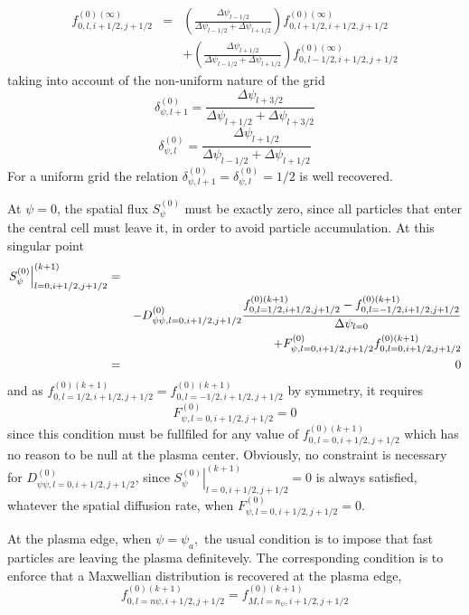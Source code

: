 \begin{eqnarray}
f_{0,l,i+1/2,j+1/2}^{\left( 0\right) (\infty )} &=&\left( \frac{\Delta \psi
_{l-1/2}}{\Delta \psi _{l-1/2}+\Delta \psi _{l+1/2}}\right)
f_{0,l+1/2,i+1/2,j+1/2}^{\left( 0\right) (\infty )}  \nonumber \\
&&+\left( \frac{\Delta \psi _{l+1/2}}{\Delta \psi _{l-1/2}+\Delta \psi
_{l+1/2}}\right) f_{0,l-1/2,i+1/2,j+1/2}^{\left( 0\right) (\infty )}
\end{eqnarray}
taking into account of the non-uniform nature of the grid
\begin{equation}
\delta _{\psi ,l+1}^{\left( 0\right) }=\frac{\Delta \psi _{l+3/2}}{\Delta
\psi _{l+1/2}+\Delta \psi _{l+3/2}}
\end{equation}
\begin{equation}
\delta _{\psi ,l}^{\left( 0\right) }=\frac{\Delta \psi _{l+1/2}}{\Delta \psi
_{l-1/2}+\Delta \psi _{l+1/2}}
\end{equation}
For a uniform grid the relation $\delta _{\psi ,l+1}^{\left( 0\right)
}=\delta _{\psi ,l}^{\left( 0\right) }=1/2$ is well recovered.

At $\psi =0$, the spatial flux $S_{\psi }^{\left( 0\right) }$ must be
exactly zero, since all particles that enter the central cell must leave it,
in order to avoid particle accumulation. At this singular point
\begin{eqnarray}
\left. S_{\psi }^{\left( 0\right) }\right| _{l=0,i+1/2,j+1/2}^{(k+1)} &=&
\nonumber \\
&&-D_{\psi \psi ,l=0,i+1/2,j+1/2}^{\left( 0\right) }\frac{%
f_{0,l=1/2,i+1/2,j+1/2}^{\left( 0\right)
(k+1)}-f_{0,l=-1/2,i+1/2,j+1/2}^{\left( 0\right) (k+1)}}{\Delta \psi _{l=0}}
\nonumber \\
&&+F_{\psi ,l=0,i+1/2,j+1/2}^{\left( 0\right) }f_{0,l=0,i+1/2,j+1/2}^{\left(
0\right) (k+1)}  \nonumber \\
&=&0
\end{eqnarray}
and as $f_{0,l=1/2,i+1/2,j+1/2}^{\left( 0\right)
(k+1)}=f_{0,l=-1/2,i+1/2,j+1/2}^{\left( 0\right) (k+1)}$ by symmetry, it
requires
\begin{equation}
F_{\psi ,l=0,i+1/2,j+1/2}^{\left( 0\right) }=0
\end{equation}
since this condition must be fullfiled for any value of $%
f_{0,l=0,i+1/2,j+1/2}^{\left( 0\right) (k+1)}$ which has no reason to be
null at the plasma center. Obviously, no constraint is necessary for $%
D_{\psi \psi ,l=0,i+1/2,j+1/2}^{\left( 0\right) }$, since $\left. S_{\psi
}^{\left( 0\right) }\right| _{l=0,i+1/2,j+1/2}^{(k+1)}=0$ is always
satisfied, whatever the spatial diffusion rate, when $F_{\psi
,l=0,i+1/2,j+1/2}^{\left( 0\right) }=0.$

At the plasma edge, when $\psi =\psi _{a},$ the usual condition is to impose
that fast particles are leaving the plasma definitevely. The corresponding
condition is to enforce that a Maxwellian distribution is recovered at the
plasma edge,
\begin{equation}
f_{0,l=n\psi ,i+1/2,j+1/2}^{\left( 0\right) (k+1)}=f_{M,l=n_{\psi
},i+1/2,j+1/2}^{\left( 0\right) (k+1)}
\end{equation}

